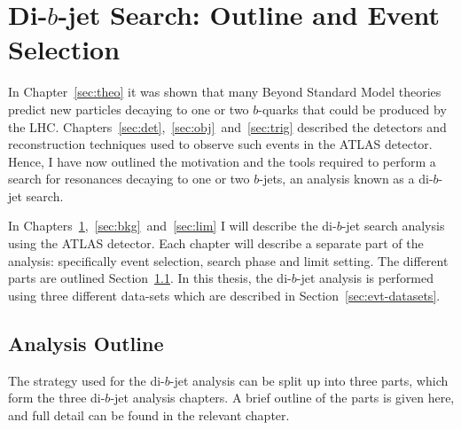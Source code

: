 \chapter{Di-$b$-jet Search: Outline and Event Selection}
\label{sec:evt}

In Chapter~\ref{sec:theo} it was shown that many Beyond Standard Model theories
predict new particles decaying to one or two $b$-quarks that could be produced by the LHC.
Chapters~\ref{sec:det},~\ref{sec:obj}~and~\ref{sec:trig}
described the detectors and reconstruction techniques used to observe such events in the ATLAS detector.
Hence, I have now outlined the motivation and the tools required to perform
a search for resonances decaying to one or two $b$-jets,
an analysis known as a di-$b$-jet search.

In Chapters~\ref{sec:evt},~\ref{sec:bkg}~and~\ref{sec:lim}
I will describe the di-$b$-jet search analysis using the ATLAS detector.
Each chapter will describe a separate part of the analysis:
specifically event selection, search phase and limit setting.
The different parts are outlined Section~\ref{sec:evt-outline}.
In this thesis, the di-$b$-jet analysis is performed using three different data-sets
which are described in Section~\ref{sec:evt-datasets}.

\vspace{-1em}
\section{Analysis Outline}
\label{sec:evt-outline}

The strategy used for the di-$b$-jet analysis
can be split up into three parts,
which form the three di-$b$-jet analysis chapters.
A brief outline of the parts is given here,
and full detail can be found in the relevant chapter.

